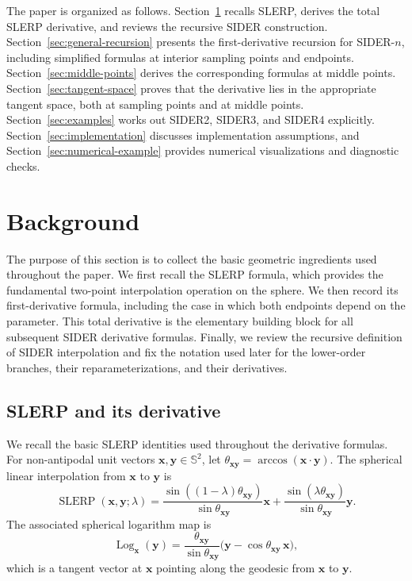 \documentclass[a4paper,11pt]{article}
\newcommand{\bx}{\mathbf{x}}
\newcommand{\by}{\mathbf{y}}
\newcommand{\Log}{\operatorname{Log}}
\numberwithin{equation}{section}
\theoremstyle{plain}
\theoremstyle{definition}
\theoremstyle{remark}
\newcommand{\Sph}{\mathbb{S}^2}
\newcommand{\slerp}{\operatorname{SLERP}}
\begin{document}
The paper is organized as follows.  Section~\ref{sec:background} recalls SLERP, derives the total SLERP derivative, and reviews the recursive SIDER construction.  Section~\ref{sec:general-recursion} presents the first-derivative recursion for SIDER-\(n\), including simplified formulas at interior sampling points and endpoints.  Section~\ref{sec:middle-points} derives the corresponding formulas at middle points.  Section~\ref{sec:tangent-space} proves that the derivative lies in the appropriate tangent space, both at sampling points and at middle points.  Section~\ref{sec:examples} works out SIDER2, SIDER3, and SIDER4 explicitly.  Section~\ref{sec:implementation} discusses implementation assumptions, and Section~\ref{sec:numerical-example} provides numerical visualizations and diagnostic checks.

\section{Background}\label{sec:background}

The purpose of this section is to collect the basic geometric ingredients used throughout the paper.  We first recall the SLERP formula, which provides the fundamental two-point interpolation operation on the sphere.  We then record its first-derivative formula, including the case in which both endpoints depend on the parameter.  This total derivative is the elementary building block for all subsequent SIDER derivative formulas.  Finally, we review the recursive definition of SIDER interpolation and fix the notation used later for the lower-order branches, their reparameterizations, and their derivatives.

\subsection{SLERP and its derivative}
We recall the basic SLERP identities used throughout the derivative formulas.  For non-antipodal unit vectors $\bx,\by\in\Sph$, let
\(\theta_{\bx\by}=\arccos(\bx\cdot\by)\).
The spherical linear interpolation from $\bx$ to $\by$ is
\[
        \slerp(\bx,\by;\lambda)
        =
        \frac{\sin((1-\lambda)\theta_{\bx\by})}{\sin\theta_{\bx\by}}\bx
        +
        \frac{\sin(\lambda\theta_{\bx\by})}{\sin\theta_{\bx\by}}\by .
\]
The associated spherical logarithm map is
\[
        \Log_{\bx}(\by)
        =
        \frac{\theta_{\bx\by}}{\sin\theta_{\bx\by}}
        \bigl(\by-\cos\theta_{\bx\by}\,\bx\bigr),
\]
which is a tangent vector at $\bx$ pointing along the geodesic from $\bx$ to $\by$.
\end{document}
